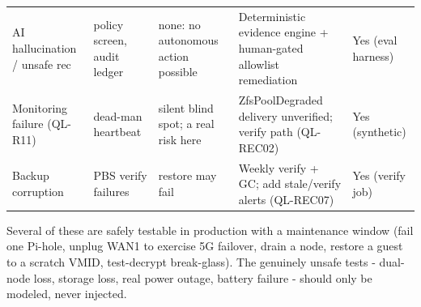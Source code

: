 \begin{tabularx}{\linewidth}{@{}p{2.5cm} p{2.6cm} p{2.6cm} X p{1.3cm}@{}}
AI hallucination / unsafe rec & policy screen, audit ledger & none: no autonomous action possible & Deterministic evidence engine + human-gated allowlist remediation & Yes (eval harness) \\
Monitoring failure (QL-R11) & dead-man heartbeat & silent blind spot; a real risk here & ZfsPoolDegraded delivery unverified; verify path (QL-REC02) & Yes (synthetic) \\
Backup corruption & PBS verify failures & restore may fail & Weekly verify + GC; add stale/verify alerts (QL-REC07) & Yes (verify job) \\
\bottomrule
\end{tabularx}

\begin{callout}
Several of these are safely testable in production with a maintenance window (fail one
Pi-hole, unplug WAN1 to exercise 5G failover, drain a node, restore a guest to a scratch
VMID, test-decrypt break-glass). The genuinely unsafe tests - dual-node loss, storage
loss, real power outage, battery failure - should only be modeled, never injected.
\end{callout}

